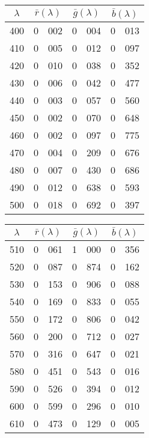 {
\small
{
\centering


\begin{minipage}{.3\textwidth}
\begin{tabular}{c|r@{.}l | r@{.}l | r@{.}l}
$\lambda$ & \multicolumn{2}{c|}{$\bar r(\lambda)$} &  \multicolumn{2}{c|}{$\bar g(\lambda)$} &  \multicolumn{2}{c}{$\bar b(\lambda)$} \\
\hline
 400 &   0&002 &   0&004 &   0&013 \\
 410 &   0&005 &   0&012 &   0&097 \\
 420 &   0&010 &   0&038 &   0&352 \\
 430 &   0&006 &   0&042 &   0&477 \\
 440 &   0&003 &   0&057 &   0&560 \\
 450 &   0&002 &   0&070 &   0&648 \\
 460 &   0&002 &   0&097 &   0&775 \\
 470 &   0&004 &   0&209 &   0&676 \\
 480 &   0&007 &   0&430 &   0&686 \\
 490 &   0&012 &   0&638 &   0&593 \\
 500 &   0&018 &   0&692 &   0&397 \\
\end{tabular}
\end{minipage}\hskip3mm
\begin{minipage}{.3\textwidth}
\begin{tabular}{c|r@{.}l | r@{.}l | r@{.}l}
$\lambda$ & \multicolumn{2}{c|}{$\bar r(\lambda)$} &  \multicolumn{2}{c|}{$\bar g(\lambda)$} &  \multicolumn{2}{c}{$\bar b(\lambda)$} \\
\hline
 510 &   0&061 &   1&000 &   0&356 \\
 520 &   0&087 &   0&874 &   0&162 \\
 530 &   0&153 &   0&906 &   0&088 \\
 540 &   0&169 &   0&833 &   0&055 \\
 550 &   0&172 &   0&806 &   0&042 \\
 560 &   0&200 &   0&712 &   0&027 \\
 570 &   0&316 &   0&647 &   0&021 \\
 580 &   0&451 &   0&543 &   0&016 \\
 590 &   0&526 &   0&394 &   0&012 \\
 600 &   0&599 &   0&296 &   0&010 \\
 610 &   0&473 &   0&129 &   0&005 \\

\end{tabular}
\end{minipage}}}
